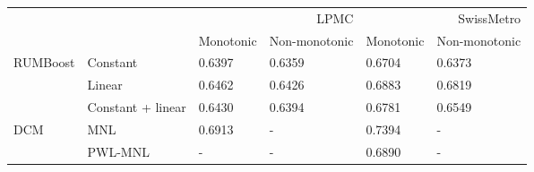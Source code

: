 \begin{tabular}{llllll}
\toprule
 &  & \multicolumn{2}{r}{LPMC} & \multicolumn{2}{r}{SwissMetro} \\
 &  & Monotonic & Non-monotonic & Monotonic & Non-monotonic \\
\midrule
\multirow[t]{3}{*}{RUMBoost} & Constant & 0.6397 & 0.6359 & 0.6704 & 0.6373 \\
 & Linear & 0.6462 & 0.6426 & 0.6883 & 0.6819 \\
 & Constant + linear & 0.6430 & 0.6394 & 0.6781 & 0.6549 \\
\cline{1-6}
\multirow[t]{2}{*}{DCM} & MNL & 0.6913 & - & 0.7394 & - \\
 & PWL-MNL & - & - & 0.6890 & - \\
\cline{1-6}
\bottomrule
\end{tabular}
